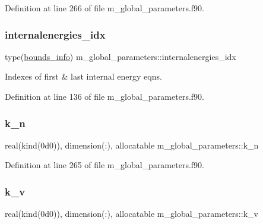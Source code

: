 Definition at line 266 of file m\+\_\+global\+\_\+parameters.\+f90.

\mbox{\label{namespacem__global__parameters_aac5ed9f316eeebbe04258bb1120cbea4}} 
\subsubsection{\texorpdfstring{internalenergies\+\_\+idx}{internalenergies\_idx}}
{\footnotesize\ttfamily type(\hyperlink{structm__derived__types_1_1bounds__info}{bounds\+\_\+info}) m\+\_\+global\+\_\+parameters\+::internalenergies\+\_\+idx}



Indexes of first \& last internal energy eqns. 



Definition at line 136 of file m\+\_\+global\+\_\+parameters.\+f90.

\mbox{\label{namespacem__global__parameters_a555eda1318a218d37d1bdd8f4d57eaf2}} 
\subsubsection{\texorpdfstring{k\+\_\+n}{k\_n}}
{\footnotesize\ttfamily real(kind(0d0)), dimension(\+:), allocatable m\+\_\+global\+\_\+parameters\+::k\+\_\+n}



Definition at line 265 of file m\+\_\+global\+\_\+parameters.\+f90.

\mbox{\label{namespacem__global__parameters_a1943ea5a5127e94a197afae57be95758}} 
\subsubsection{\texorpdfstring{k\+\_\+v}{k\_v}}
{\footnotesize\ttfamily real(kind(0d0)), dimension(\+:), allocatable m\+\_\+global\+\_\+parameters\+::k\+\_\+v}



